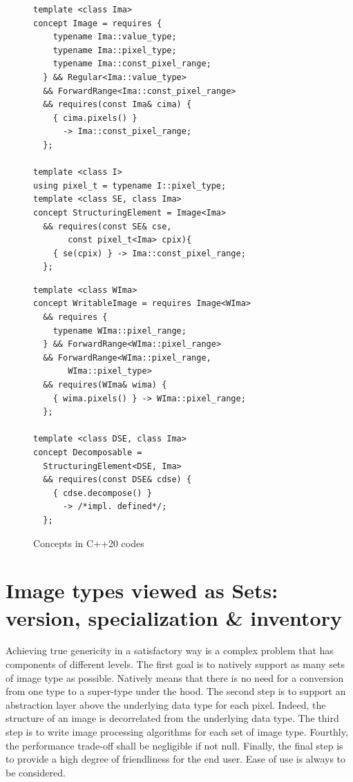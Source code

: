 \begin{figure}[htbp]

  \begin{minipage}[l]{0.48\linewidth}
    \begin{verbatim}
template <class Ima>
concept Image = requires {
    typename Ima::value_type;
    typename Ima::pixel_type;
    typename Ima::const_pixel_range;
  } && Regular<Ima::value_type>
  && ForwardRange<Ima::const_pixel_range>
  && requires(const Ima& cima) {
    { cima.pixels() }
      -> Ima::const_pixel_range;
  };

template <class I>
using pixel_t = typename I::pixel_type;
template <class SE, class Ima>
concept StructuringElement = Image<Ima>
  && requires(const SE& cse,
       const pixel_t<Ima> cpix){
    { se(cpix) } -> Ima::const_pixel_range;
  };
\end{verbatim}
  \end{minipage}
  \hfill
  \begin{minipage}[r]{0.48\linewidth}
    \begin{verbatim}
template <class WIma>
concept WritableImage = requires Image<WIma>
  && requires {
    typename WIma::pixel_range;
  } && ForwardRange<WIma::pixel_range>
  && ForwardRange<WIma::pixel_range,
       WIma::pixel_type>
  && requires(WIma& wima) {
    { wima.pixels() } -> WIma::pixel_range;
  };

template <class DSE, class Ima>
concept Decomposable =
  StructuringElement<DSE, Ima>
  && requires(const DSE& cdse) {
    { cdse.decompose() }
      -> /*impl. defined*/;
  };
\end{verbatim}
  \end{minipage}

  \caption{Concepts in C++20 codes}
  \label{code:concept.cpp20}
\end{figure}


\section{Image types viewed as Sets: version, specialization \& inventory}
\label{sec:image.set}

Achieving true genericity in a satisfactory way is a complex problem that has components of different levels. The first
goal is to natively support as many sets of image type as possible. Natively means that there is no need for a
conversion from one type to a super-type under the hood. The second step is to support an abstraction layer above the
underlying data type for each pixel. Indeed, the structure of an image is decorrelated from the underlying data type.
The third step is to write image processing algorithms for each set of image type. Fourthly, the performance trade-off
shall be negligible if not null. Finally, the final step is to provide a high degree of friendliness for the end user.
Ease of use is always to be considered.


